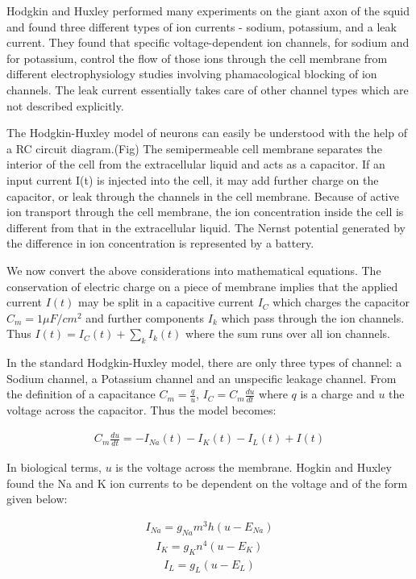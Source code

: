 \documentclass[10pt,letterpaper]{article}
\begin{document}
Hodgkin and Huxley performed many experiments on the giant axon of the squid and found three different types of ion currents - sodium, potassium, and a leak current. They found that specific voltage-dependent ion channels, for sodium and for potassium, control the flow of those ions through the cell membrane from different electrophysiology studies involving phamacological blocking of ion channels. The leak current essentially takes care of other channel types which are not described explicitly. 

The Hodgkin-Huxley model of neurons can easily be understood with the help of a RC circuit diagram.(Fig) The semipermeable cell membrane separates the interior of the cell from the extracellular liquid and acts as a capacitor. If an input current I(t) is injected into the cell, it may add further charge on the capacitor, or leak through the channels in the cell membrane. Because of active ion transport through the cell membrane, the ion concentration inside the cell is different from that in the extracellular liquid. The Nernst potential generated by the difference in ion concentration is represented by a battery.

We now convert the above considerations into mathematical equations. The conservation of electric charge on a piece of membrane implies that the applied current $I(t)$ may be split in a capacitive current $I_C$ which charges the capacitor $C_m = 1 \mu F/cm^2$ and further components $I_k$ which pass through the ion channels. Thus $I(t) = I_C(t) + \sum_kI_k(t)$ where the sum runs over all ion channels. 

In the standard Hodgkin-Huxley model, there are only three types of channel: a Sodium channel, a Potassium channel and an unspecific leakage channel. From the definition of a capacitance $C_m=\frac{q}{u}$, $I_C=C_m\frac{du}{dt}$ where $q$ is a charge and $u$ the voltage across the capacitor. Thus the model becomes:

\begin{eqnarray}\label{d3_1}C_m\frac{du}{dt}=−I_{Na}(t)−I_{K}(t)−I_{L}(𝑡)+I(t)\end{eqnarray}

In biological terms, $u$ is the voltage across the membrane. Hogkin and Huxley found the Na and K ion currents to be dependent on the voltage and of the form given below:

\begin{eqnarray}\label{d3_2}I_{Na} = g_{Na}m^3h(u−E_{Na})\end{eqnarray}
\begin{eqnarray}\label{d3_3}I_K = g_Kn^4(u−E_K)\end{eqnarray}
\begin{eqnarray}\label{d3_4}I_L = g_L(u−E_L)\end{eqnarray}
\end{document}

